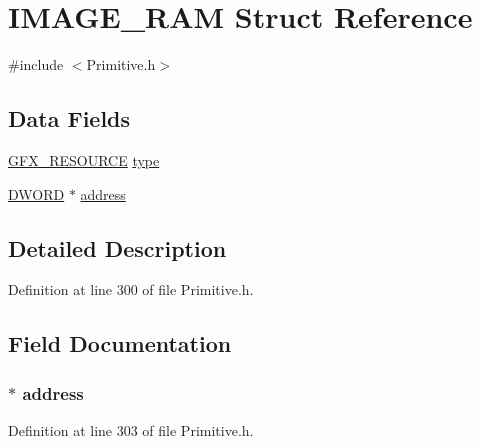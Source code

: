 \hypertarget{struct_i_m_a_g_e___r_a_m}{}\section{I\+M\+A\+G\+E\+\_\+\+R\+A\+M Struct Reference}
\label{struct_i_m_a_g_e___r_a_m}


{\ttfamily \#include $<$Primitive.\+h$>$}

\subsection*{Data Fields}
\begin{DoxyCompactItemize}
\item 
\hyperlink{_primitive_8h_a9a3785e6345a6e01071a873d03698baf}{G\+F\+X\+\_\+\+R\+E\+S\+O\+U\+R\+C\+E} \hyperlink{struct_i_m_a_g_e___r_a_m_ad19c8e0d19c638be9dd81d163454b0f1}{type}
\item 
\hyperlink{_generic_type_defs_8h_ad342ac907eb044443153a22f964bf0af}{D\+W\+O\+R\+D} $\ast$ \hyperlink{struct_i_m_a_g_e___r_a_m_a8200da623dcde59f2f227c0390dd440a}{address}
\end{DoxyCompactItemize}


\subsection{Detailed Description}


Definition at line 300 of file Primitive.\+h.



\subsection{Field Documentation}
\hypertarget{struct_i_m_a_g_e___r_a_m_a8200da623dcde59f2f227c0390dd440a}{}
\subsubsection[{address}]{$\ast$ address}\label{struct_i_m_a_g_e___r_a_m_a8200da623dcde59f2f227c0390dd440a}


Definition at line 303 of file Primitive.\+h.

\hypertarget{struct_i_m_a_g_e___r_a_m_ad19c8e0d19c638be9dd81d163454b0f1}{}
